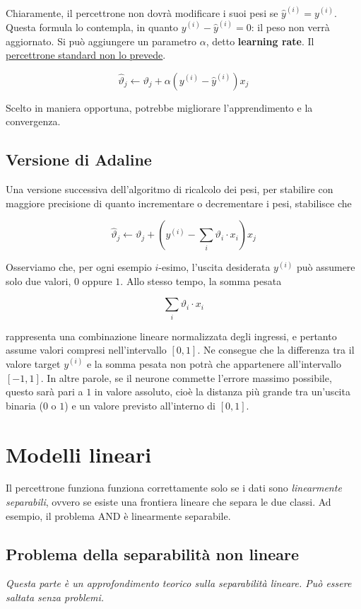 Chiaramente, il percettrone non dovrà modificare i suoi pesi se $\hat{y}^{(i)} = y^{(i)}$. Questa formula lo contempla, in quanto $y^{(i)} - \hat{y}^{(i)} = 0$: il peso non verrà aggiornato. 
Si può aggiungere un parametro $\alpha$, detto \textbf{learning rate}. Il \underline{percettrone standard non lo prevede}.

$$
\hat{\vartheta}_j \leftarrow \vartheta_j + \alpha( y^{(i)} -\hat{y}^{(i)})x_j
$$

\noindent
Scelto in maniera opportuna, potrebbe migliorare l'apprendimento e la convergenza.

\subsection{Versione di Adaline}

Una versione successiva dell'algoritmo di ricalcolo dei pesi, per stabilire con maggiore precisione di quanto incrementare o decrementare i pesi, stabilisce che

$$
\hat{\vartheta}_j \leftarrow \vartheta_j + \left( y^{(i)} - \sum_{i}\vartheta_i \cdot x_i\right)x_j
$$

\noindent
Osserviamo che, per ogni esempio $i$-esimo, l'uscita desiderata $y^{(i)}$ può assumere solo due valori, $0$ oppure $1$. Allo stesso tempo, la somma pesata 

\[
\sum_i \vartheta_i \cdot x_i
\]

\noindent
rappresenta una combinazione lineare normalizzata degli ingressi, e pertanto assume valori compresi nell'intervallo $[0,1]$.  Ne consegue che la differenza tra il valore target $y^{(i)}$ e la somma pesata non potrà che appartenere all’intervallo $[-1,1]$. In altre parole, se il neurone commette l’errore massimo possibile, questo sarà pari a $1$ in valore assoluto, cioè la distanza più grande tra un’uscita binaria ($0$ o $1$) e un valore previsto all’interno di $[0,1]$.

\section{Modelli lineari}
Il percettrone funziona funziona correttamente solo se i dati sono \emph{linearmente separabili}, ovvero se esiste una frontiera lineare che separa le due classi. Ad esempio, il problema AND è linearmente separabile.

\subsection{Problema della separabilità non lineare}
\textit{Questa parte è un approfondimento teorico sulla separabilità lineare. Può essere saltata senza problemi.}

